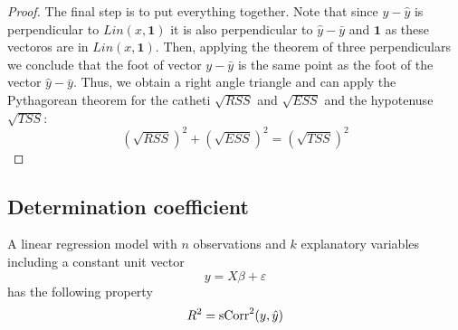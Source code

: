 \begin{proof}
The final step is to put everything together.
Note that since $y - \hat y$ is perpendicular to $Lin(x, \mathbf{1})$ it is also perpendicular to $\hat y - \bar y$ and $\mathbf{1}$ as these vectoros are in $Lin(x, \mathbf{1})$.
Then, applying the theorem of three perpendiculars we conclude that the foot of vector $y - \bar y$ is the same point as the foot of the vector $\hat y - \bar y$.
Thus, we obtain a right angle triangle and can apply the Pythagorean theorem for the catheti $\sqrt{RSS}$ and $\sqrt{ESS}$ and the
hypotenuse $\sqrt{TSS}$:
\[
(\sqrt{RSS})^2 + (\sqrt{ESS})^2 = (\sqrt{TSS})^2
\]
\end{proof}


\subsection{Determination coefficient}


\begin{theorem}
A linear regression model with $n$ observations and $k$ explanatory variables including a constant unit vector
\[
y = X \beta + \varepsilon
\]
has the following property
\[
R^2 = \operatorname{sCorr}^2(y, \hat y)
\]
\end{theorem}

